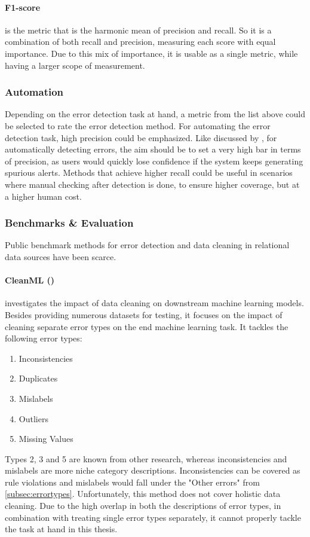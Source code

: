 \paragraph{F1-score}
is the metric that is the harmonic mean of precision and recall. So it is a combination of both recall and precision, measuring each score with equal importance. Due to this mix of importance, it is usable as a single metric, while having a larger scope of measurement.

\subsubsection{Automation}
Depending on the error detection task at hand, a metric from the list above could be selected to rate the error detection method. For automating the error detection task, high precision could be emphasized. 
Like discussed by \cite{Huang2018-er}, for automatically detecting errors, the aim should be to set a very high bar in terms of
precision, as users would quickly lose confidence if the system keeps
generating spurious alerts. Methods that achieve higher recall could be useful in scenarios where manual checking after detection is done, to ensure higher coverage, but at a higher human cost.

\subsubsection{Benchmarks \& Evaluation}
Public benchmark methods for error detection and data cleaning in relational data sources have been scarce. 
\paragraph{CleanML (\cite{Li2019-ve})} investigates the impact of data cleaning on downstream machine learning models. Besides providing numerous datasets for testing, it focuses on the impact of cleaning separate error types on the end machine learning task. It tackles the following error types:
\begin{enumerate}
    \item Inconsistencies
    \item Duplicates
    \item Mislabels
    \item Outliers
    \item Missing Values
\end{enumerate}
Types 2, 3 and 5 are known from other research, whereas inconsistencies and mislabels are more niche category descriptions. Inconsistencies can be covered as rule violations and mislabels would fall under the "Other errors" from \autoref{subsec:errortypes}. Unfortunately, this method does not cover holistic data cleaning. Due to the high overlap in both the descriptions of error types, in combination with treating single error types separately, it cannot properly tackle the task at hand in this thesis.

